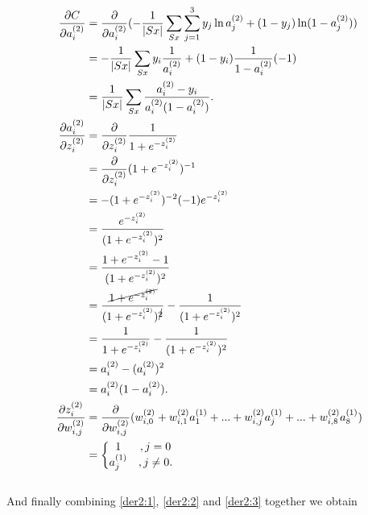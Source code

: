 \documentclass[12pt,titlepage]{article}
\begin{document}
\begin{subequations}
\begin{align}
 \frac{\partial C}{\partial a_{i}^{(2)}} 
 &  = \frac{\partial }{\partial a_{i}^{(2)}}(-\frac{1}{|Sx|}\sum_{Sx}\sum_{j=1}^{3}y_{j}\ln a_{j}^{(2)} + (1-y_{j})\ln (1-a_{j}^{(2)})) \notag \\
 & = -\frac{1}{|Sx|}\sum_{Sx}y_{i}\frac{1}{a_{i}^{(2)}}+(1-y_{i})\frac{1}{1-a_{i}^{(2)}}(-1) \notag \\
 & =\frac{1}{|Sx|}\sum_{Sx}\frac{a_{i}^{(2)}-y_{i}}{a_{i}^{(2)}(1-a_{i}^{(2)})}. \label{der2:1}\\
\frac{\partial a_{i}^{(2)}}{\partial z_{i}^{(2)}}
&= \frac{\partial }{\partial z_{i}^{(2)}}\frac{1}{1+e^{-z_{i}^{(2)}}} \notag\\
&=\frac{\partial }{\partial z_{i}^{(2)}}(1+e^{-z_{i}^{(2)}})^{-1} \notag\\
&=-(1+e^{-z_{i}^{(2)}})^{-2}(-1)e^{-z_{i}^{(2)}} \notag\\
&=\frac{e^{-z_{i}^{(2)}}}{(1+e^{-z_{i}^{(2)}})^{2}} \notag\\
&=\frac{1+e^{-z_{i}^{(2)}}-1}{(1+e^{-z_{i}^{(2)}})^{2}} \notag\\
&=\frac{\cancel{1+e^{-z_{i}^{(2)}}}}{(1+e^{-z_{i}^{(2)}})^{\cancel{2}}}-\frac{1}{(1+e^{-z_{i}^{(2)}})^{2}} \notag\\
&=\frac{1}{1+e^{-z_{i}^{(2)}}}-\frac{1}{(1+e^{-z_{i}^{(2)}})^{2}} \notag\\
&=a_{i}^{(2)}-(a_{i}^{(2)})^{2} \notag\\
&=a_{i}^{(2)}(1-a_{i}^{(2)}). \label{der2:2}\\
\frac{\partial z_{i}^{(2)}}{\partial w_{i,j}^{(2)}}
&=\frac{\partial }{\partial w_{i,j}^{(2)}}(w_{i,0}^{(2)}+w_{i,1}^{(2)}a_{1}^{(1)}+...+w_{i,j}^{(2)}a_{j}^{(1)}+...+w_{i,8}^{(2)}a_{8}^{(1)}) \notag\\
&=\left\{\begin{matrix} 1&, j=0\\ a_{j}^{(1)}&, j\neq 0. \end{matrix}\right. \label{der2:3}
\end{align}
\end{subequations}
\\And finally combining \eqref{der2:1}, \eqref{der2:2} and \eqref{der2:3} together we obtain
\end{document}
